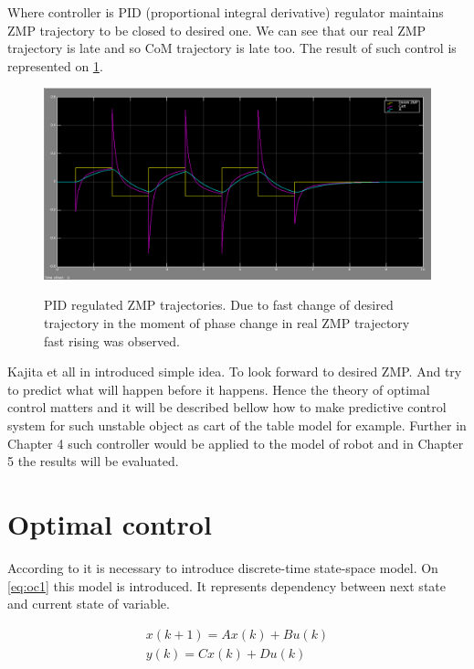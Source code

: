 \documentclass[12pt,a4paper]{report}
\begin{document}
		Where controller is PID (proportional integral derivative) regulator maintains ZMP trajectory to be closed to desired one. We can see that our real ZMP trajectory is late and so CoM trajectory is late too. The result of such control is represented on \cref{fig:10}.
		\begin{figure}[h!]
			\vspace{-0.2cm}
			\centering
			{\includegraphics[width=1\textwidth]{10}}
			\caption{PID regulated ZMP trajectories. Due to fast change of desired trajectory in the moment of phase change in real ZMP trajectory fast rising was observed.}
			\label{fig:10}
			\vspace{-0.1cm}
		\end{figure}
		Kajita et all in \cite{kajita2003biped} introduced simple idea. To look forward to desired ZMP. And try to predict what will happen before it happens. Hence the theory of optimal control matters and it will be described bellow how to make predictive control system for such unstable object as cart of the table model for example. Further in Chapter 4 such controller would be applied to the model of robot and in Chapter 5 the results will be evaluated.
		
		\section{Optimal control}
			According to \cite{hazell2008discrete} it is necessary to introduce discrete-time state-space model. On \ref{eq:oc1} this model is introduced. It represents dependency between next state and current state of variable.
			
			\begin{equation}\label{eq:oc1}
				\begin{split}
					x(k+1) = Ax(k) + Bu(k)\\
					y(k) = Cx(k) + Du(k)
				\end{split}
			\end{equation}
			
\end{document}
